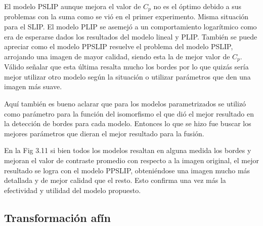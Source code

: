 El modelo PSLIP aunque mejora el valor de $C_p$ no es el \'optimo debido a sus problemas con la suma como se vi\'o en el primer experimento. Misma situaci\'on para el SLIP. El modelo PLIP se asemej\'o a un comportamiento logar\'itmico como era de esperarse dados los resultados del modelo lineal y PLIP. Tambi\'en se puede apreciar como el modelo PPSLIP resuelve el problema del modelo PSLIP, arrojando una imagen de mayor calidad, siendo esta la de mejor valor de $C_p$. V\'alido se\~nalar que esta \'ultima resalta mucho los bordes por lo que quiz\'as ser\'ia mejor utilizar otro modelo seg\'un la situaci\'on o utilizar par\'ametros que den una imagen m\'as suave.

Aqu\'i tambi\'en es bueno aclarar que para los modelos parametrizados se utiliz\'o como par\'ametro para la funci\'on del isomorfismo el que di\'o el mejor resultado en la detecci\'on de bordes para cada modelo. Entonces lo que se hizo fue buscar los mejores par\'ametros que dieran el mejor resultado para la fusi\'on.

En la Fig 3.11 si bien todos los modelos resaltan en alguna medida los bordes y mejoran el valor de contraste promedio con respecto a la imagen original, el mejor resultado se logra con el modelo PPSLIP, obteni\'endose una imagen mucho m\'as detallada y de mejor calidad que el resto. Esto confirma una vez m\'as la efectividad y utilidad del modelo propuesto.

\subsection{Transformaci\'on af\'in}

